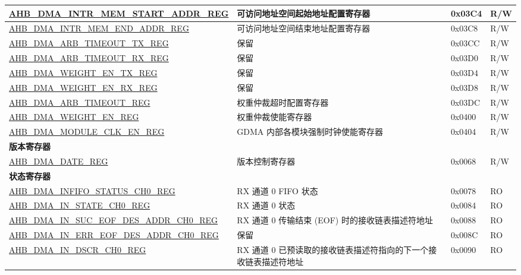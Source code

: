 \begin{longtable}{ | p{8cm} | p{8cm} | p{1.3cm} | p{1.5cm} | }
\hyperref[regdesc:AHBDMAINTRMEMSTARTADDRREG]{AHB\_DMA\_INTR\_MEM\_START\_ADDR\_REG} & 可访问地址空间起始地址配置寄存器 & 0x03C4 & R/W \\ \hline
\hyperref[regdesc:AHBDMAINTRMEMENDADDRREG]{AHB\_DMA\_INTR\_MEM\_END\_ADDR\_REG} & 可访问地址空间结束地址配置寄存器 & 0x03C8 & R/W \\ \hline
\hyperref[regdesc:AHBDMAARBTIMEOUTTXREG]{AHB\_DMA\_ARB\_TIMEOUT\_TX\_REG} & 保留 & 0x03CC & R/W \\ \hline
\hyperref[regdesc:AHBDMAARBTIMEOUTRXREG]{AHB\_DMA\_ARB\_TIMEOUT\_RX\_REG} & 保留 & 0x03D0 & R/W \\ \hline
\hyperref[regdesc:AHBDMAWEIGHTENTXREG]{AHB\_DMA\_WEIGHT\_EN\_TX\_REG} & 保留 & 0x03D4 & R/W \\ \hline
\hyperref[regdesc:AHBDMAWEIGHTENRXREG]{AHB\_DMA\_WEIGHT\_EN\_RX\_REG} & 保留 & 0x03D8 & R/W \\ \hline
\hyperref[regdesc:AHBDMAARBTIMEOUTREG]{AHB\_DMA\_ARB\_TIMEOUT\_REG} & 权重仲裁超时配置寄存器 & 0x03DC & R/W \\ \hline
\hyperref[regdesc:AHBDMAWEIGHTENREG]{AHB\_DMA\_WEIGHT\_EN\_REG} & 权重仲裁使能寄存器 & 0x0400 & R/W \\ \hline
\hyperref[regdesc:AHBDMAMODULECLKENREG]{AHB\_DMA\_MODULE\_CLK\_EN\_REG} & GDMA 内部各模块强制时钟使能寄存器 & 0x0404 & R/W \\ \hline
\multicolumn{4}{|l|}{\textbf{版本寄存器}} \\ \hline
\hyperref[regdesc:AHBDMADATEREG]{AHB\_DMA\_DATE\_REG} & 版本控制寄存器 & 0x0068 & R/W \\ \hline
\multicolumn{4}{|l|}{\textbf{状态寄存器}} \\ \hline
\hyperref[regdesc:AHBDMAINFIFOSTATUSCHNREG]{AHB\_DMA\_INFIFO\_STATUS\_CH0\_REG} & RX 通道 0 FIFO 状态 & 0x0078 & RO \\ \hline
\hyperref[regdesc:AHBDMAINSTATECHNREG]{AHB\_DMA\_IN\_STATE\_CH0\_REG} & RX 通道 0 状态 & 0x0084 & RO \\ \hline
\hyperref[regdesc:AHBDMAINSUCEOFDESADDRCHNREG]{AHB\_DMA\_IN\_SUC\_EOF\_DES\_ADDR\_CH0\_REG} & RX 通道 0 传输结束 (EOF) 时的接收链表描述符地址 & 0x0088 & RO \\ \hline
\hyperref[regdesc:AHBDMAINERREOFDESADDRCH0REG]{AHB\_DMA\_IN\_ERR\_EOF\_DES\_ADDR\_CH0\_REG} & 保留 & 0x008C & RO \\ \hline
\hyperref[regdesc:AHBDMAINDSCRCHNREG]{AHB\_DMA\_IN\_DSCR\_CH0\_REG} & RX 通道 0 已预读取的接收链表描述符指向的下一个接收链表描述符地址 & 0x0090 & RO \\ \hline

\end{longtable}
